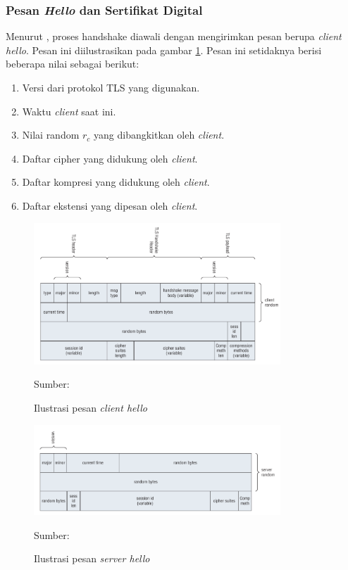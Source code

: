 \subsubsection{Pesan \emph{Hello} dan Sertifikat Digital}
Menurut \textcite{rfc5246}, proses handshake diawali dengan mengirimkan pesan berupa \emph{client hello}. Pesan ini diilustrasikan pada gambar \ref{fig:tls.clienthello}. Pesan ini setidaknya berisi beberapa nilai sebagai berikut:
\begin{enumerate}
  \item Versi dari protokol TLS yang digunakan.
  \item Waktu \emph{client} saat ini.
  \item Nilai random $r_c$ yang dibangkitkan oleh \emph{client}.
  \item Daftar cipher yang didukung oleh \emph{client}.
  \item Daftar kompresi yang didukung oleh \emph{client}.
  \item Daftar ekstensi yang dipesan oleh \emph{client}.
\end{enumerate}

\begin{figure}[!h]
  \centering
  \includegraphics[width=350px]{chapters/res/chapter-2/img/tls.hello.client.png}
  \caption{Ilustrasi pesan \emph{client hello}} \label{fig:tls.clienthello}
  Sumber: \textcite{joshua2011}
\end{figure}

\begin{figure}[!h]
  \centering
  \includegraphics[width=350px]{chapters/res/chapter-2/img/tls.hello.server.png}
  \caption{Ilustrasi pesan \emph{server hello}} \label{fig:tls.serverhello}
  Sumber: \textcite{joshua2011}
\end{figure}

